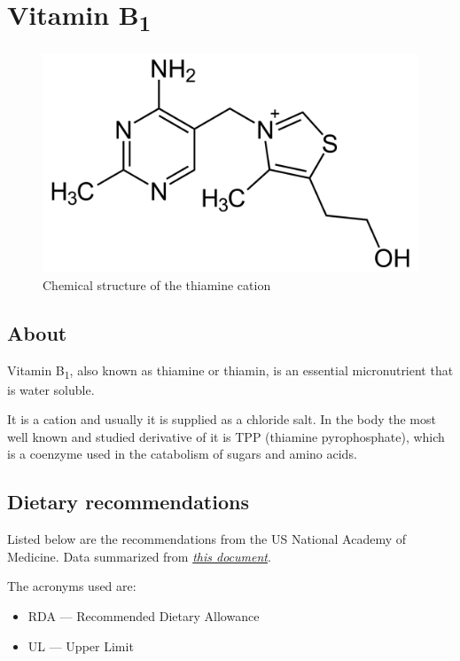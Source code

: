 \documentclass{book}
\begin{document}
\begin{sloppypar}
\chapter{Vitamin B\texorpdfstring{\textsubscript{1}}{1}}
\begin{figure}[h]
	\caption{Chemical structure of the thiamine cation}
	\centering \includegraphics[width=\textwidth]{images/Vitamin_B1_chemical_structure}
\end{figure}
\newpage

\section{About}
Vitamin B\textsubscript{1}, also known as thiamine or thiamin, is an essential micronutrient that is water soluble.

It is a cation and usually it is supplied as a chloride salt.
In the body the most well known and studied derivative of it is TPP (thiamine pyrophosphate), which is a coenzyme used in the catabolism of sugars and amino acids.

\section{Dietary recommendations}
Listed below are the recommendations from the US National Academy of Medicine. Data summarized from \href{https://nap.nationalacademies.org/read/6015/chapter/6}{\textit{this document}}.

The acronyms used are:
\begin{itemize}
	\item RDA --- Recommended Dietary Allowance
	\item UL --- Upper Limit
\end{itemize}


\end{sloppypar}
\end{document}
